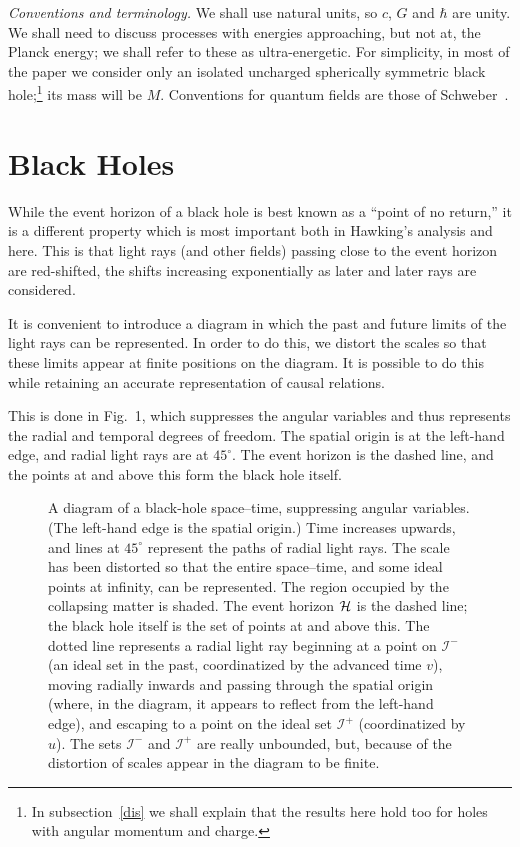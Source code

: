 \documentclass[12pt]{article}
\def\scrip{{\mathcal I}^-}
\def\scrif{{\mathcal I}^+}
\begin{document}
\textit{Conventions and terminology.}
We shall use natural units, so $c$, $G$ and $\hbar$ are unity.    We shall need
to discuss processes with  energies approaching, but not at, the Planck energy;
we shall refer to these as ultra-energetic. 
For simplicity, in most of the paper we consider only an isolated uncharged
spherically symmetric black hole;\footnote{In subsection~\ref{dis} we shall
explain that the results here hold too for holes with angular momentum and
charge.} its mass will be $M$.
Conventions for quantum fields are those of Schweber~\cite{Schweber:1961}.


\section{Black Holes}
\label{BH}

While the event horizon of a black hole is best known as a ``point of no
return,'' it is a different property which is most important both in Hawking's
analysis and here.  This is that light rays (and other fields) passing close to
the event horizon are red-shifted, the shifts increasing exponentially as later
and later rays are considered.

It is convenient to introduce a diagram in which the past and future limits of
the light rays can be represented.  In order to do this, we distort the scales
so that these limits appear at finite positions on the diagram.  It is possible
to do this while retaining an accurate representation of causal relations.

This is done in Fig.~1, which suppresses the angular variables and thus
represents the radial and temporal degrees of freedom.  The spatial origin is
at the left-hand edge, and radial light rays are at $45^\circ$.   The event
horizon is the dashed line, and the points at and above this form the black 
hole itself.  

\begin{figure}[h]
\epsfxsize=2in
\caption{A diagram of a black-hole space--time, suppressing angular
variables.  (The left-hand edge is the spatial origin.) Time increases
upwards, and lines at $45^\circ$ represent the paths of radial light
rays.   The scale has been distorted so that the entire space--time, and some
ideal points at infinity, can be represented.  The region occupied by the
collapsing matter is shaded.  The event horizon ${\cal H}$ is the dashed line; 
the black hole itself is the set of points at and above this. The dotted line
represents a radial light ray beginning at a point on $\scrip$ (an ideal set in
the past, coordinatized by the advanced time $v$), moving radially inwards and
passing through the spatial origin (where, in the diagram, it appears to
reflect from the left-hand edge), and escaping to a point on the ideal set
$\scrif$ (coordinatized by $u$).  The sets $\scrip$ and $\scrif$ are really
unbounded, but, because of the distortion of scales appear in the diagram to be
finite.}
\end{figure}
\end{document}
